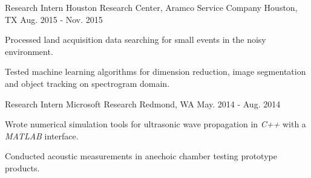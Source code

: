 \begin{cventries}
	\cventry
		{Research Intern} %
		{Houston Research Center, Aramco Service Company} %
		{Houston, TX} %
		{Aug. 2015 - Nov. 2015} %
		{
			\begin{cvitems} %
				\item {Processed land acquisition data searching for small events in the noisy environment.}
				\item {Tested machine learning algorithms for dimension reduction, image segmentation and object tracking on spectrogram domain.}
			\end{cvitems}
		}

	\cventry
		{Research Intern} %
		{Microsoft Research} %
		{Redmond, WA} %
		{May. 2014 - Aug. 2014} %
		{
			\begin{cvitems} %
				\item {Wrote numerical simulation tools for ultrasonic wave propagation in \textit{C++} with a \textit{MATLAB} interface.}
				\item {Conducted acoustic measurements in anechoic chamber testing prototype products.}
			\end{cvitems}
		}


\end{cventries}
